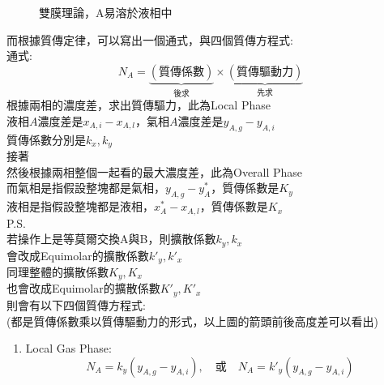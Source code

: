\documentclass[../main.tex]{subfiles}
\begin{document}
\begin{itemize}
  \begin{figure}[H]
    \centering
    \caption{雙膜理論，A易溶於液相中}
  \end{figure}
  而根據質傳定律，可以寫出一個通式，與四個質傳方程式:\\
  通式:
  \begin{equation}
    N_A = \underbrace{\left(\text{質傳係數}\right)}_{\text{後求}}\times\underbrace{\left(\text{質傳驅動力}\right)}_{\text{先求}}
  \end{equation}
  根據兩相的濃度差，求出質傳驅力，此為Local Phase\\
  液相$A$濃度差是$x_{A,i}-x_{A,l}$，氣相$A$濃度差是$y_{A,g}-y_{A,i}$\\
  質傳係數分別是$k_x,k_y$\\
  接著\\
  然後根據兩相整個一起看的最大濃度差，此為Overall Phase\\
  而氣相是指假設整塊都是氣相，$\boxed{y_{A,g}-y_A^\ast}$，質傳係數是$K_y$\\
  液相是指假設整塊都是液相，$\boxed{x_A^\ast - x_{A,l}}$，質傳係數是$K_x$\\
  P.S.\\
  若操作上是等莫爾交換A與B，則擴散係數$k_y,k_x$\\
  會改成Equimolar的擴散係數$k'_y,k'_x$\\
  同理整體的擴散係數$K_y,K_x$\\
  也會改成Equimolar的擴散係數$K'_y,K'_x$\\
  則會有以下四個質傳方程式:\\
  (都是質傳係數乘以質傳驅動力的形式，以上圖的箭頭前後高度差可以看出)
  \begin{enumerate}
    \item  Local Gas Phase:
      \begin{equation}
        N_A = k_y\left(y_{A,g}-y_{A,i}\right),\quad \text{或}\quad N_A = k'_y\left(y_{A,g}-y_{A,i}\right)

\end{equation}
\end{enumerate}
\end{itemize}
\end{document}
